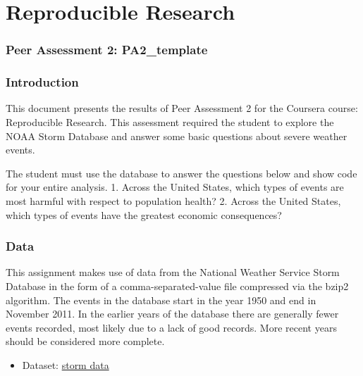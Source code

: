 \documentclass[]{article}
\title{}
\author{}
\date{}
\begin{document}
\maketitle


\section{Reproducible Research}\label{reproducible-research}

\subsubsection{Peer Assessment 2:
PA2\_template}\label{peer-assessment-2-pa2ux5ftemplate}

\subsubsection{Introduction}\label{introduction}

This document presents the results of Peer Assessment 2 for the Coursera
course: Reproducible Research. This assessment required the student to
explore the NOAA Storm Database and answer some basic questions about
severe weather events.

The student must use the database to answer the questions below and show
code for your entire analysis. 1. Across the United States, which types
of events are most harmful with respect to population health? 2. Across
the United States, which types of events have the greatest economic
consequences?

\subsubsection{Data}\label{data}

This assignment makes use of data from the National Weather Service
Storm Database in the form of a comma-separated-value file compressed
via the bzip2 algorithm. The events in the database start in the year
1950 and end in November 2011. In the earlier years of the database
there are generally fewer events recorded, most likely due to a lack of
good records. More recent years should be considered more complete.

\begin{itemize}
\itemsep1pt\parskip0pt
\item
  Dataset:
  \href{https://d396qusza40orc.cloudfront.net/repdata\%2Fdata\%2FStormData.csv.bz2}{storm
  data}
\end{itemize}
\end{document}
